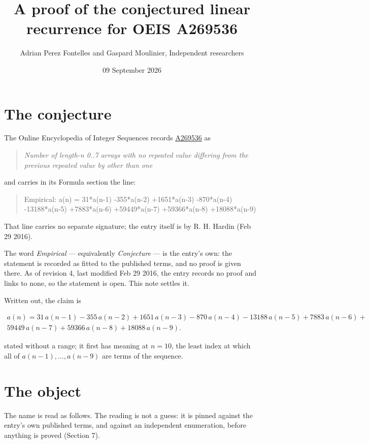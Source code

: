 \documentclass[11pt]{article}
\title{A proof of the conjectured linear recurrence for OEIS A269536}
\author{Adrian Perez Fontelles and Gaspard Moulinier, Independent researchers}
\date{09 September 2026}
\theoremstyle{definition}
\begin{document}
\maketitle
\section{The conjecture}

The Online Encyclopedia of Integer Sequences records \href{https://oeis.org/A269536}{A269536} as

\begin{quote}\itshape Number of length-n 0..7 arrays with no repeated value differing from the previous repeated value by other than one\end{quote}

and carries in its Formula section the line:

\begin{quote}\ttfamily Empirical: a(n) = 31*a(n-1) -355*a(n-2) +1651*a(n-3) -870*a(n-4) -13188*a(n-5) +7883*a(n-6) +59449*a(n-7) +59366*a(n-8) +18088*a(n-9)\end{quote}

That line carries no separate signature; the entry itself is by R. H. Hardin (Feb 29 2016).

The word {\itshape Empirical} --- equivalently {\itshape Conjecture} --- is the entry's own: the statement is recorded as fitted to the published terms, and no proof is given there. As of revision 4, last modified Feb 29 2016, the entry records no proof and links to none, so the statement is open. This note settles it.

Written out, the claim is

\begin{multline*} a(n) = 31\,a(n-1) - 355\,a(n-2) + 1651\,a(n-3) - 870\,a(n-4) - 13188\,a(n-5) + 7883\,a(n-6) + \\ 59449\,a(n-7) + 59366\,a(n-8) + 18088\,a(n-9). \end{multline*}

stated without a range; it first has meaning at $n = 10$, the least index at which all of $a(n-1),\dots,a(n-9)$ are terms of the sequence.

\section{The object}

The name is read as follows. The reading is not a guess: it is pinned against the entry's own published terms, and against an independent enumeration, before anything is proved (Section 7).
\end{document}

